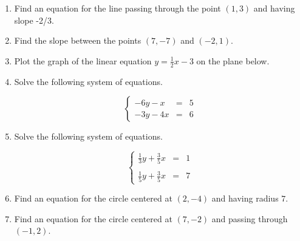 \documentclass{article}
\begin{document}
\ActivityTitle[class={College Algebra}, number={1}, name={Lines and Circles}]

\begin{enumerate}
\item Find an equation for the line passing through the point $(1, 3)$ and having slope -2/3. \vspace{5cm}

\item Find the slope between the points $(7, -7)$ and $(-2, 1)$. \vspace{5cm}

\item Plot the graph of the linear equation $y = \frac{1}{2} x - 3$ on the plane below.\begin{center}
\CartesianPlane[h=7,w=7,axes=yes]
\end{center}

  

\newpage

\item Solve the following system of equations.

\[ \left\{ \begin{array}{rcl} -6y - x & = & 5 \\ -3y - 4x & = & 6 \end{array} \right. \] \vspace{5cm}

\item Solve the following system of equations.

\[ \left\{ \begin{array}{rcl} \frac{1}{3}y + \frac{3}{5}x & = & 1 \\ & & \\ \frac{1}{5}y + \frac{3}{5}x & = & 7 \end{array} \right. \] \vspace{5cm}

\item Find an equation for the circle centered at $(2, -4)$ and having radius $7$. \vspace{2cm}

\item Find an equation for the circle centered at $(7, -2)$ and passing through $(-1, 2)$. \vspace{5cm}
\end{enumerate}
\end{document}
